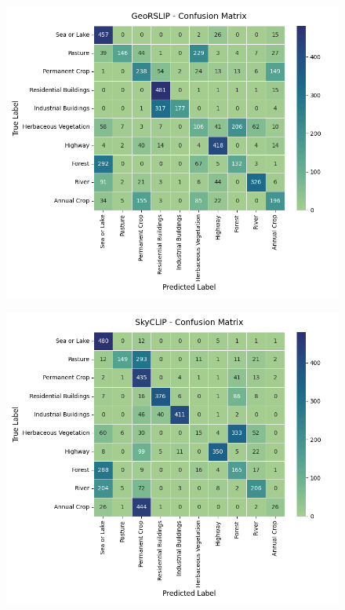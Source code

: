 \documentclass[a4paper, oneside, english]{sapthesis} %
\begin{document}
\begin{minipage}{\textwidth}
    \medskip

    \begin{subfigure}[t]{0.48\textwidth}
      \centering
      \includegraphics[width=\linewidth]{img/EuroSAT_GeoRSCLIP_32_cm.png}
    \end{subfigure}
    \hfill
    \begin{subfigure}[t]{0.48\textwidth}
      \centering
      \includegraphics[width=\linewidth]{img/EuroSAT_SkyCLIP_32_cm.png}
    \end{subfigure}

    \label{fig:eurosatbaselinescm}
\end{minipage}
\end{document}
